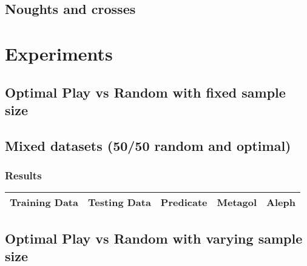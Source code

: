 \documentclass[a4paper,12pt]{report}
\begin{document}
\section{Noughts and crosses}
\chapter{Experiments}
\section{Optimal Play vs Random with fixed sample size}
\section{Mixed datasets (50/50 random and optimal)}
\subsection{Results}
\begin{center}
\begin{tabular}{| l | l | l | l | l |}
\hline
Training Data & Testing Data & Predicate & Metagol & Aleph \\ \hline
\end{tabular}
\end{center}
\section{Optimal Play vs Random with varying sample size}


\end{document}
